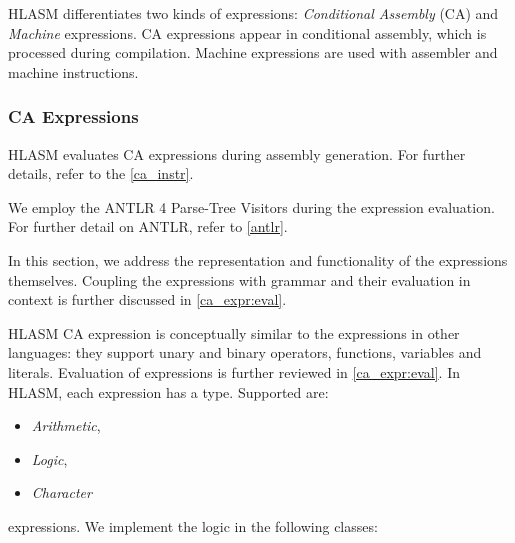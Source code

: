 HLASM differentiates two kinds of expressions: \emph{Conditional Assembly} (CA) and \emph{Machine} expressions. CA expressions appear in conditional assembly, which is processed during compilation. Machine expressions are used with assembler and machine instructions.

\subsubsection{CA Expressions}
\label{ca_expr:logic}

HLASM evaluates CA expressions during assembly generation. For further details, refer to the \cref{ca_instr}.

We employ the ANTLR 4 Parse-Tree Visitors during the expression evaluation. For further detail on ANTLR, refer to \cref{antlr}.

In this section, we address the representation and functionality of the expressions themselves. Coupling the expressions with grammar and their evaluation in context is further discussed in \cref{ca_expr:eval}.

HLASM CA expression is conceptually similar to the expressions in other languages: they support unary and binary operators, functions, variables and literals. Evaluation of expressions is further reviewed in \cref{ca_expr:eval}. In HLASM, each expression has a type. Supported are:

\begin{itemize}
	\item  \emph{Arithmetic},
	\item  \emph{Logic},
	\item  \emph{Character}
\end{itemize}

expressions. We implement the logic in the following classes:

